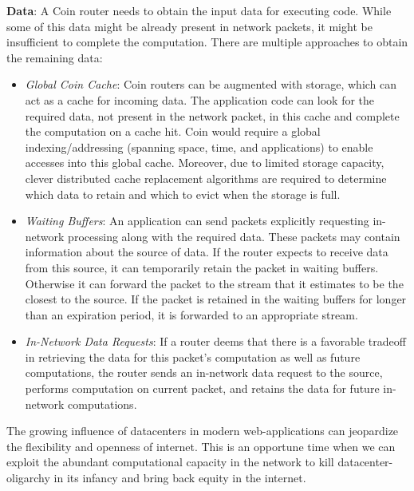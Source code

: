 \documentclass[twocolumn]{article}
\begin{document}
\textbf{Data}: A Coin router needs to obtain the input data for executing code. While some
of this data might be already present in network packets, it might be insufficient to
complete the computation. There are multiple approaches to obtain the remaining data:
\begin{itemize}
\item \textit{Global Coin Cache}: Coin routers can be augmented with storage, which can
act as a cache for incoming data. The application code can look for the required data,
not present in the network packet, in this cache and complete the computation on a cache
hit. Coin would require a global indexing/addressing (spanning space, time, and applications)
to enable accesses into this global cache. Moreover, due to limited storage capacity, clever
distributed cache replacement algorithms are required to determine which data to retain
and which to evict when the storage is full.
\item \textit{Waiting Buffers}: An application can send packets explicitly requesting
in-network processing along with the required data. These packets may contain information
about the source of data. If the router expects to receive data from this source, it can
temporarily retain the packet in waiting buffers. Otherwise it can forward the packet
to the stream that it estimates to be the closest to the source. If the packet is retained
in the waiting buffers for longer than an expiration period, it is forwarded to an
appropriate stream.
\item \textit{In-Network Data Requests}: If a router deems that there is a favorable tradeoff
in retrieving the data for this packet’s computation as well as future computations, the router
sends an in-network data request to the source, performs computation on current packet, and
retains the data for future in-network computations.
\end{itemize}

The growing influence of datacenters in modern web-applications can jeopardize the flexibility
and openness of internet. This is an opportune time when we can exploit the abundant computational
capacity in the network to kill datacenter-oligarchy in its infancy and bring back equity in the
internet.

% 
% 
\end{document}
